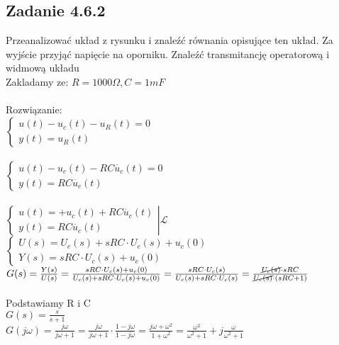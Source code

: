 {\subsection*{Zadanie 4.6.2} {\color{darkgray}
\begin{figure}[!h]
\end{figure}
\noindent Przeanalizować układ z rysunku i znaleźć równania opisujące ten układ. Za wyjście
przyjąć napięcie na oporniku. Znaleźć transmitancję operatorową i widmową układu\\
Zakladamy ze: $R=1000\Omega,C=1mF$\\\\
Rozwiązanie:\\
\noindent $\begin{cases}
u(t)-u_c(t)-u_R(t)=0\\
y(t)=u_R(t)
\end{cases}$\\\\
$\begin{cases}
u(t)-u_c(t)-RC\dot{u_c}(t)=0\\
y(t)=RC\dot{u_c}(t)
\end{cases}$\\\\
$\left.\begin{cases}
u(t)=+u_c(t)+RC\dot{u_c}(t)\\
y(t)=RC\dot{u_c}(t)
\end{cases}\right|\mathscr{L}$\\
$\begin{cases}
U(s)=U_c(s)+sRC\cdot U_c(s)+u_c(0)\\
Y(s)=sRC\cdot U_c(s)+u_c(0)
\end{cases}$\\
$G(s)=\frac{Y(s)}{U(s)}=\frac{sRC\cdot U_c(s)+u_c(0)}{U_c(s)+sRC\cdot U_c(s)+u_c(0)}=\frac{sRC\cdot U_c(s)}{U_c(s)+sRC\cdot U_c(s)}=\frac{\cancel{U_c(s)}\cdot sRC}{\cancel{U_c(s)}\cdot (sRC+1)}$\\\\
Podstawiamy R i C\\
$G(s)=\frac{s}{s+1}$\\
$G(j\omega)=\frac{j\omega}{j\omega+1}=\frac{j\omega}{j\omega+1}\cdot \frac{1-j\omega}{1-j\omega}=\frac{j\omega+\omega^2}{1+\omega^2}=\frac{\omega^2}{\omega^2+1}+j\frac{\omega}{\omega^2+1}$
\pagebreak
}}
